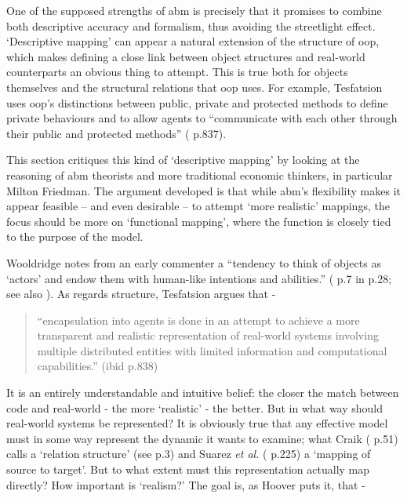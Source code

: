 One of the supposed strengths of \gls{abm} is precisely that it promises to combine both descriptive accuracy and formalism, thus avoiding the streetlight effect. `Descriptive mapping' can appear a natural extension of the structure of \gls{oop}, which makes defining a close link between object structures and real-world counterparts an obvious thing to attempt. This is true both for objects themselves and the structural relations that \gls{oop} uses. For example, Tesfatsion uses \gls{oop}'s distinctions between public, private and protected methods to define private behaviours and to allow agents to ``communicate with each other through their public and protected methods'' (\citealt{tesfatsion_agent-based_2006} p.837). 

This section critiques this kind of `descriptive mapping' by looking at the reasoning of \gls{abm} theorists and more traditional economic thinkers, in particular Milton Friedman. The argument developed is that while \gls{abm}'s flexibility makes it appear feasible – and even desirable – to attempt `more realistic' mappings, the focus should be more on `functional mapping', where the function is closely tied to the purpose of the model.

Wooldridge notes from an early commenter a ``tendency to think of objects as `actors' and endow them with human-like intentions and abilities.'' (\citealt{next_computer_inc._object-oriented_1993} p.7 in \citealt{wooldridge_introduction_2009} p.28; see also \citealt{franklin_is_1996}). As regards structure, Tesfatsion argues that -

\begin{quote}
``encapsulation into agents is done in an attempt to achieve a more transparent and realistic representation of real-world systems involving multiple distributed entities with limited information and computational capabilities.'' (ibid p.838)
\end{quote}

It is an entirely understandable and intuitive belief: the closer the match between code and real-world - the more `realistic' - the better. But in what way should real-world systems be represented? It is obviously true that any effective model must in some way represent the dynamic it wants to examine; what Craik (\citeyear{craik_nature_1967} p.51) calls a `relation structure' (see \citealt{stafford_what_2009} p.3) and Suarez \emph{et al.} (\citeyear{suarez_scientific_2003} p.225) a `mapping of source to target'. But to what extent must this representation actually map directly? How important is `realism?' The goal is, as Hoover puts it, that - 

